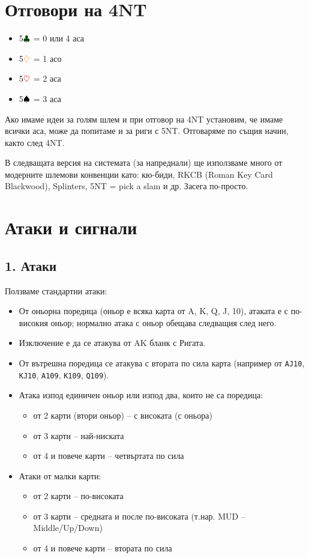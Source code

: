 \documentclass[10pt,a5paper]{extarticle}
\newcommand{\Rheart}{\textcolor{red}{\heartsuit}}
\newcommand{\Rdiamond}{\textcolor{orange}{\diamondsuit}}
\newcommand{\Bspade}{\textcolor{black}{\spadesuit}}
\newcommand{\Bclub}{\textcolor{darkgreen}{\clubsuit}}
\begin{document}
\section{Отговори на 4NT}
\begin{itemize}
  \item[] 5$\Bclub$ = 0 или 4 аса  
  \item[] 5$\Rdiamond$ = 1 асо  
  \item[] 5$\Rheart$ = 2 аса  
  \item[] 5$\Bspade$ = 3 аса  
\end{itemize}

Ако имаме идеи за голям шлем и при отговор на 4NT установим, че имаме всички аса, може да попитаме и за риги с 5NT. Отговаряме по същия начин, както след 4NT.  

В следващата версия на системата (за напреднали) ще използваме много от модерните шлемови конвенции като: кю-биди, RKCB (Roman Key Card Blackwood), Splinters, 5NT = pick a slam и др.  
Засега по-просто.
\newpage
\section{Атаки и сигнали}

\subsection*{1. Атаки}
Ползваме стандартни атаки:  

\begin{itemize}
  \item[] От оньорна поредица (оньор е всяка карта от A, K, Q, J, 10), атаката е с по-високия оньор; нормално атака с оньор обещава следващия след него.  
  \item[] Изключение е да се атакува от AK бланк с Ригата.  
  \item[] От вътрешна поредица се атакува с втората по сила карта (например от \texttt{AJ10}, \texttt{KJ10}, \texttt{A109}, \texttt{K109}, \texttt{Q109}).  
  \item[] Атака изпод единичен оньор или изпод два, които не са поредица:  
    \begin{itemize}
      \item[] от 2 карти (втори оньор) -- с високата (с оньора)  
      \item[] от 3 карти -- най-ниската  
      \item[] от 4 и повече карти -- четвъртата по сила  
    \end{itemize}
  \item[] Атаки от малки карти:  
    \begin{itemize}
      \item[] от 2 карти -- по-високата  
      \item[] от 3 карти -- средната и после по-високата (т.нар. MUD – Middle/Up/Down)  
      \item[] от 4 и повече карти -- втората по сила  
    \end{itemize}
\end{itemize}
\end{document}
